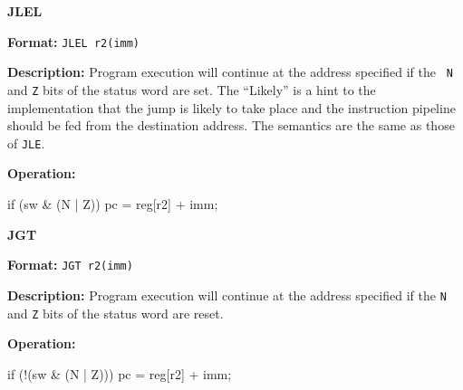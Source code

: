 \noindent\textsf{\textbf{\Large JLEL}}\par
{}\par\begin{indented}{\bf Format:}
{\tt JLEL r2(imm)}\par\vspace{3ex}
\end{indented}\vspace{4ex}
\begin{indented}{\bf Description:}
Program execution will continue at the address specified if the {\tt
N} and {\tt Z} bits of the status word are set.  The ``Likely'' is a
hint to the implementation that the jump is likely to take place and
the instruction pipeline should be fed from the destination address. 
The semantics are the same as those of {\tt JLE}.
\end{indented}
\begin{indented}{\bf Operation:}\vspace{.8ex}
\begin{verbatimtab}
if (sw & (N | Z)) {
    pc = reg[r2] + imm;
}
\end{verbatimtab}
\end{indented}
\vspace{2em}

\newpage
\noindent\textsf{\textbf{\Large JGT}}\par
{}\par\begin{indented}{\bf Format:}
{\tt JGT r2(imm)}\par\vspace{3ex}
\end{indented}\vspace{4ex}
\begin{indented}{\bf Description:}
Program execution will continue at the address specified if the {\tt N} and
{\tt Z} bits of the status word are reset.
\end{indented}
\begin{indented}{\bf Operation:}\vspace{.8ex}
\begin{verbatimtab}
if (!(sw & (N | Z))) {
    pc = reg[r2] + imm;
}
\end{verbatimtab}
\end{indented}
\vspace{2em}

